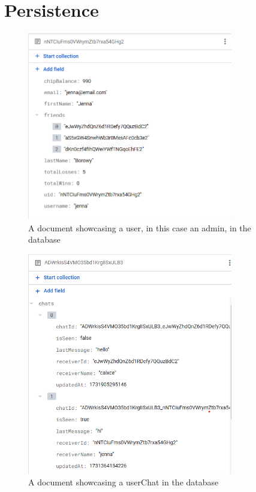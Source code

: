 \section{Persistence}

\begin{figure}[!htb]
    \centering
    \includegraphics[width=0.8\textwidth]{figures/DB Screenshot user.png}
    \caption{A document showcasing a user, in this case an admin, in the database}
    \label{fig:userDB}
\end{figure}

\begin{figure}[!htb]
    \centering
    \includegraphics[width=0.8\textwidth]{figures/DB Screenshot userChats.png}
    \caption{A document showcasing a userChat in the database}
    \label{fig:userChatDB}
\end{figure}

